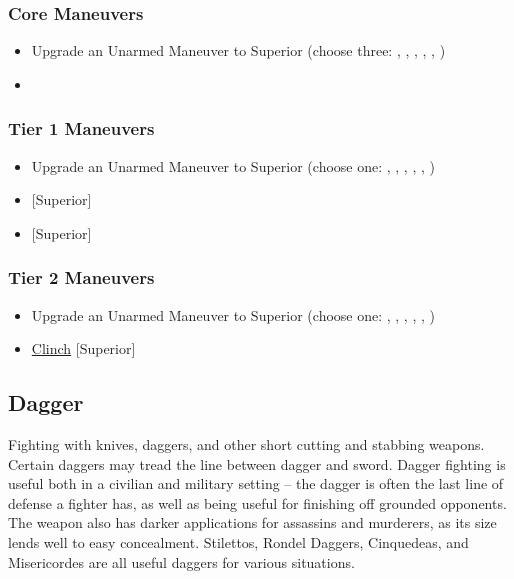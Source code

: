 \documentclass[oneside,11pt,english]{book}
\begin{document}
\subsubsection{Core Maneuvers}
\vspace{-5pt}\begin{itemize}
  [itemsep=0.5mm]
\item Upgrade an Unarmed Maneuver to Superior (choose three: , , , , , )
\item {}
\end{itemize}

\subsubsection{Tier 1 Maneuvers}
\vspace{-5pt} \begin{itemize}
  [itemsep=0.5mm]
\item Upgrade an Unarmed Maneuver to Superior (choose one: , , , , , )
\item {} [Superior]
\item {} [Superior]
\end{itemize}
\subsubsection{Tier 2 Maneuvers}
\vspace{-5pt}\begin{itemize}
  [itemsep=0.5mm]
\item Upgrade an Unarmed Maneuver to Superior (choose one: , , , , , )
\item \hyperref[man:Clinch (Attack)]{Clinch} [Superior]
\end{itemize}

\subsection{Dagger}
Fighting with knives, daggers, and other short cutting and stabbing weapons. Certain daggers may tread 
the line between dagger and sword. Dagger fighting is useful both in a civilian and military setting -- the 
dagger is often the last line of defense a fighter has, as well as being useful for finishing off grounded 
opponents. The weapon also has darker applications for assassins and murderers, as its size lends well to 
easy concealment. Stilettos, Rondel Daggers, Cinquedeas, and Misericordes are all useful daggers for various situations.
\end{document}
